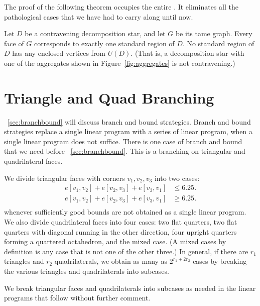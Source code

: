 The proof of the following theorem occupies the entire \chap. It
eliminates all the pathological cases that we have had to carry
along until now.

\begin{theorem} \label{theorem:noaggregate}
Let $D$ be a contravening decomposition star, and let $G$ be its
tame graph.  Every face of $G$ corresponds to exactly one standard
region of $D$.  No standard region of $D$ has any enclosed
vertices from $U(D)$. (That is, a decomposition star with one of
the aggregates shown in Figure~\ref{fig:aggregates} is not
contravening.)
\end{theorem}

\section{Triangle and Quad Branching}
\label{sec:tribranch}

\Chap~\ref{sec:branchbound} will discuss branch and bound
strategies. Branch and bound strategies replace a single linear
program with a series of linear program, when a single linear
program does not suffice. There is one case of branch and bound
that we need before \Chap~\ref{sec:branchbound}.  This is a
branching on triangular and quadrilateral faces.

We divide triangular faces with corners $v_1,v_2,v_3$ into two
cases:
    $$
    \begin{array}{lll}
        e[v_1,v_2]+e[v_2,v_3]+e[v_3,v_1] &\le 6.25.\\
        e[v_1,v_2]+e[v_2,v_3]+e[v_3,v_1] &\ge 6.25.\\
    \end{array}
    $$
whenever sufficiently good bounds are not obtained as a single
linear program.  We also divide quadrilateral faces into four
cases: two flat quarters, two flat quarters with diagonal running
in the other direction, four upright quarters forming a quartered
octahedron, and the mixed case.  (A mixed cases by definition is
any case that is not one of the other three.) In general, if there
are $r_1$ triangles and $r_2$ quadrilaterals, we obtain as many as
$2^{r_1 + 2 r_2}$ cases by breaking the various triangles and
quadrilaterals into subcases.

We break triangular faces and quadrilaterals into subcases as
needed in the linear programs that follow without further comment.



